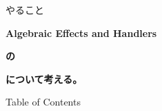 \switchfooter
\begin{frame}{やること}
    \begin{center}
        \large
        \textbf{\Huge\alert{Algebraic Effects and Handlers}}

        \textbf{の}

        \textbf{\LARGE{}}

        \textbf{について考える。}
    \end{center}
\end{frame}
\begin{frame}{Table of Contents}
    \begin{multicols}{2}
        \tableofcontents
    \end{multicols}
\end{frame}
\switchfooter
\notoc
